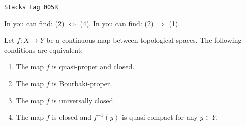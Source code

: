 \begin{theorem}
\label{topology-theorem-characterize-proper}
\href{https://stacks.math.columbia.edu/tag/005R}{\texttt{Stacks tag 005R}}

\begin{reference}
In \cite[I, p. 75, Theorem 1]{Bourbaki} you can find:
(2) $\Leftrightarrow$ (4).
In \cite[I, p. 77, Proposition 6]{Bourbaki} you can find:
(2) $\Rightarrow$ (1).
\end{reference}
Let $f: X\to Y$ be a continuous map between
topological spaces. The following conditions are equivalent:
\begin{enumerate}
\item The map $f$ is quasi-proper and closed.
\item The map $f$ is Bourbaki-proper.
\item The map $f$ is universally closed.
\item The map $f$ is closed and $f^{-1}(y)$ is quasi-compact for any
$y\in Y$.
\end{enumerate}
\end{theorem}

